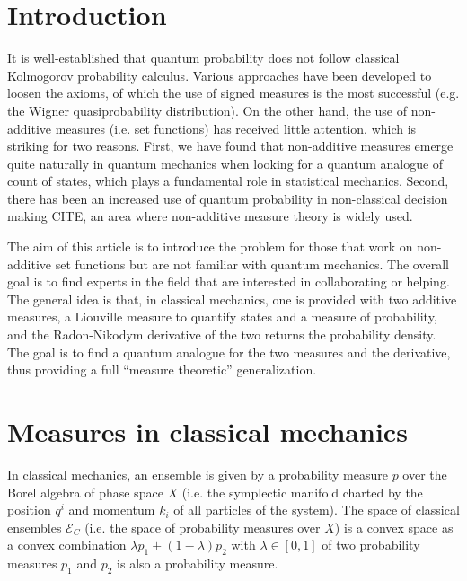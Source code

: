 \documentclass{styles/svproc}
\begin{document}
\section{Introduction}
%
It is well-established that quantum probability does not follow classical Kolmogorov probability calculus. Various approaches have been developed to loosen the axioms, of which the use of signed measures is the most successful (e.g. the Wigner quasiprobability distribution).\cite{gleason1957measures,groenewold1946principles,gudder2009quantum,hamhalter2003quantum,monchietti2023measure,moyal1949quantum,sorkin1994quantum,svozil2022extending} On the other hand, the use of non-additive measures (i.e. set functions) has received little attention, which is striking for two reasons. First, we have found that non-additive measures emerge quite naturally in quantum mechanics when looking for a quantum analogue of count of states\cite{aop-phys-QuantumRequiresNonAdditiveMeasures}, which plays a fundamental role in statistical mechanics. Second, there has been an increased use of quantum probability in non-classical decision making CITE, an area where non-additive measure theory is widely used.

The aim of this article is to introduce the problem for those that work on non-additive set functions but are not familiar with quantum mechanics. The overall goal is to find experts in the field that are interested in collaborating or helping. The general idea is that, in classical mechanics, one is provided with two additive measures, a Liouville measure to quantify states and a measure of probability, and the Radon-Nikodym derivative of the two returns the probability density. The goal is to find a quantum analogue for the two measures and the derivative, thus providing a full ``measure theoretic'' generalization.

\section{Measures in classical mechanics}

In classical mechanics, an ensemble is given by a probability measure $p$ over the Borel algebra of phase space $X$ (i.e. the symplectic manifold charted by the position $q^i$ and momentum $k_i$ of all particles of the system). The space of classical ensembles $\mathcal{E}_C$ (i.e. the space of probability measures over $X$) is a convex space as a convex combination $\lambda p_1 + (1 - \lambda) p_2$ with $\lambda \in [0,1]$ of two probability measures $p_1$ and $p_2$ is also a probability measure.
\end{document}
